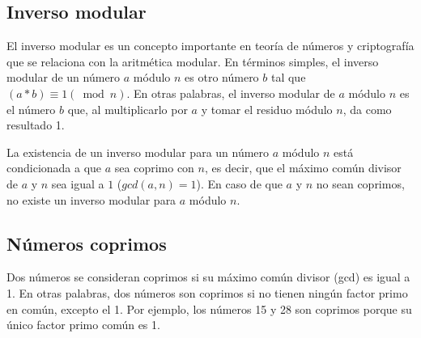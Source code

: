 \subsection{Inverso modular}
El inverso modular es un concepto importante en teoría de números y criptografía que se relaciona con la aritmética modular. En términos simples, el inverso modular de un número $a$ módulo $n$ es otro número $b$ tal que $(a * b) \equiv 1 (\bmod n)$. En otras palabras, el inverso modular de $a$ módulo $n$ es el número $b$ que, al multiplicarlo por $a$ y tomar el residuo módulo $n$, da como resultado 1.

La existencia de un inverso modular para un número $a$ módulo $n$ está condicionada a que $a$ sea coprimo con $n$, es decir, que el máximo común divisor de $a$ y $n$ sea igual a $1$ ($gcd(a, n) = 1$). En caso de que $a$ y $n$ no sean coprimos, no existe un inverso modular para $a$ módulo $n$.



\subsection{Números coprimos}

Dos números se consideran coprimos si su máximo común divisor (gcd) es igual a 1. En otras palabras, dos números son coprimos si no tienen ningún factor primo en común, excepto el 1. Por ejemplo, los números 15 y 28 son coprimos porque su único factor primo común es 1.